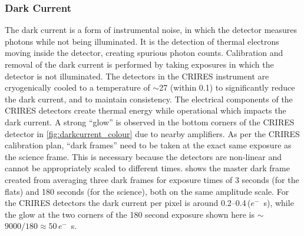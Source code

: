 \subsubsection{Dark Current}
\label{subsubsec:darkcurrent}
The dark current is a form of instrumental noise, in which the detector measures photons while not being illuminated.
It is the detection of thermal electrons moving inside the detector, creating spurious photon counts.
Calibration and removal of the dark current is performed by taking exposures in which the detector is not illuminated.
The detectors in the {CRIRES} instrument are cryogenically cooled to a temperature of \(\sim\)27\K{} (within 0.1\K{}) to significantly reduce the dark current, and to maintain consistency.
The electrical components of the {CRIRES} detectors create thermal energy while operational which impacts the dark current.
A strong ``glow'' is observed in the bottom corners of the {CRIRES} detector in \cref{fig:darkcurrent_colour} due to nearby amplifiers.
As per the {CRIRES} calibration plan, ``dark frames'' need to be taken at the exact same exposure as the science frame.
This is necessary because the detectors are non-linear and cannot be appropriately scaled to different times.
 shows the master dark frame created from averaging three dark frames for exposure times of 3 seconds (for the flats) and 180 seconds (for the science), both on the same amplitude scale.
For the {CRIRES} detectors the dark current per pixel is around 0.2--0.4\,(\(e^{-}\)\si{\per\second}), while the glow at the two corners of the 180 second exposure shown here is \(\sim\)\(9000 / 180\approx50\)\,\(e^{-}\)\si{\per\second}.

%


